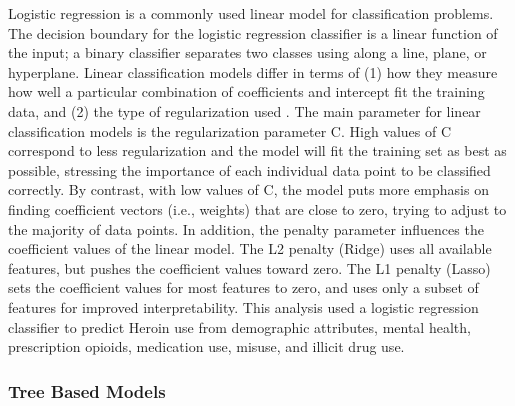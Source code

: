 \documentclass[sigconf]{acmart}
\begin{document}
Logistic regression is a commonly used linear model for classification 
problems. The decision boundary for the logistic regression classifier is a 
linear function of the input; a binary classifier separates two classes using 
along a line, plane, or hyperplane. Linear classification models differ in 
terms of (1) how they measure how well a particular combination of coefficients 
and intercept fit the training data, and (2) the type of regularization used 
\cite{muller17}. The main parameter for linear classification models is the
regularization parameter C. High values of C correspond to less regularization 
and the model will fit the training set as best as possible, stressing the 
importance of each individual data point to be classified correctly. By 
contrast, with low values of C, the model puts more emphasis on finding 
coefficient vectors (i.e., weights) that are close to zero, trying to adjust 
to the majority of data points. In addition, the penalty parameter influences 
the coefficient values of the linear model. The L2 penalty (Ridge) uses all 
available features, but pushes the coefficient values toward zero. The L1 
penalty (Lasso) sets the coefficient values for most features to zero, and uses 
only a subset of features for improved interpretability. This analysis used a 
logistic regression classifier to predict Heroin use from demographic 
attributes, mental health, prescription opioids, medication use, misuse, 
and illicit drug use. 

\subsubsection{Tree Based Models}
\end{document}
